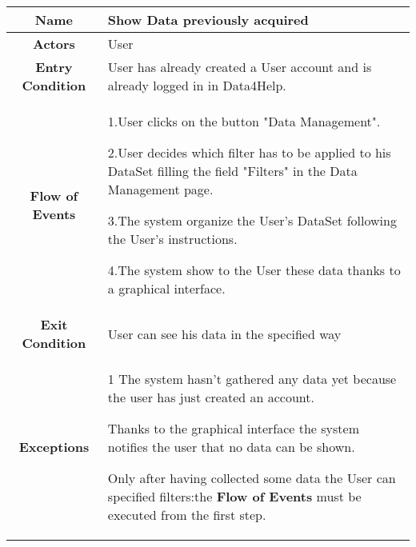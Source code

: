 \begin{table}[h!]
   \centering
    \begin{tabularx}{\linewidth}{|c|X|}
         \hline
         \textbf{Name} & Show Data previously acquired\\
	\hline
	\textbf{Actors} & User\\
	\hline
	\textbf{Entry Condition} & User has already created a User account and is already logged in in Data4Help.\\
	\hline
	\textbf{Flow of Events} &
					1.User clicks on the button "Data Management".

					2.User decides which filter has to be applied to his DataSet filling the field "Filters" in the Data 						Management page.

					3.The system organize the User's DataSet following the User's instructions.

					4.The system show to the User these data thanks to a graphical interface. \\
	\hline
	\textbf{Exit Condition} & User can see his data in the specified way\\
	
	\hline
	\textbf{Exceptions} & 1 The system hasn't gathered any data yet because the user has just created an account. 

				Thanks to the graphical interface the system notifies the user that no data can be shown.

				Only after having collected some data the User can specified filters:the \textbf{Flow of Events} must be 				executed from the first step.\\

        \hline
      \end{tabularx}
      \end{table}
